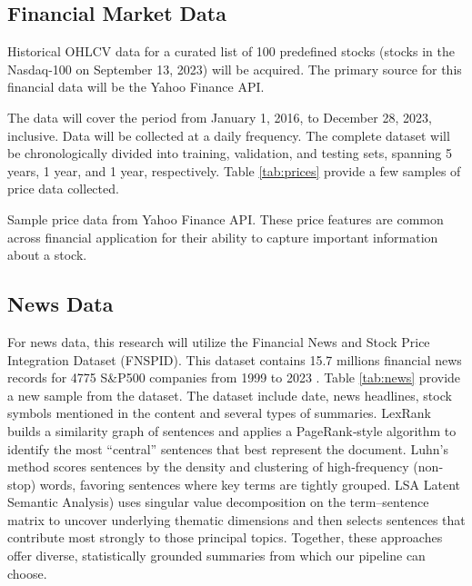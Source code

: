 \subsection{Financial Market Data}
Historical \gls{OHLCV} data for a curated list of 100 predefined stocks (stocks in the Nasdaq-100 on September 13, 2023) will be acquired. The primary source for this financial data will be the Yahoo Finance API. 

The data will cover the period from January 1, 2016, to December 28, 2023, inclusive. Data will be collected at a daily frequency. The complete dataset will be chronologically divided into training, validation, and testing sets, spanning 5 years, 1 year, and 1 year, respectively. Table \ref{tab:prices} provide a few samples of price data collected.

\begin{table}
  \centering
  \small
  \caption{Sample price data from Yahoo Finance API. These price features are common across financial application for their ability to capture important information about a stock.}
  \label{tab:prices}
\end{table}

\subsection{News Data}
For news data, this research will utilize the Financial News and Stock Price Integration Dataset (FNSPID). This dataset contains 15.7 millions financial news records for 4775 S\&P500 companies from 1999 to 2023 \cite{Dong2024}. Table \ref{tab:news} provide a new sample from the dataset. The dataset include date, news headlines, stock symbols mentioned in the content and several types of summaries. LexRank builds a similarity graph of sentences and applies a PageRank‐style algorithm to identify the most “central” sentences that best represent the document. Luhn's method scores sentences by the density and clustering of high‐frequency (non‐stop) words, favoring sentences where key terms are tightly grouped. \gls{LSA} Latent Semantic Analysis) uses singular value decomposition on the term–sentence matrix to uncover underlying thematic dimensions and then selects sentences that contribute most strongly to those principal topics. Together, these approaches offer diverse, statistically grounded summaries from which our pipeline can choose.

